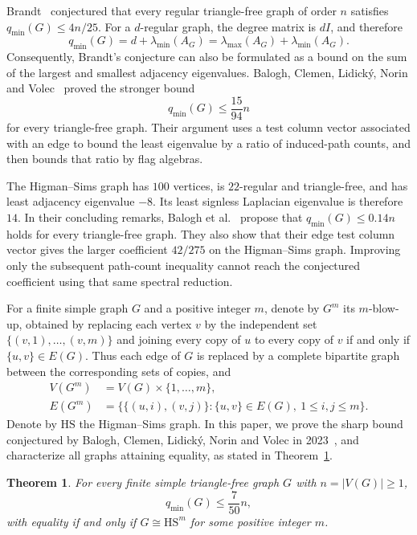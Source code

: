 \documentclass[11pt]{article}
\newcommand{\qmin}{q_{\min}}
\newtheorem{theorem}{Theorem}
\begin{document}
Brandt~\cite{Brandt} conjectured that every regular triangle-free graph
of order $n$ satisfies $\qmin(G)\leq4n/25$. For a $d$-regular graph,
the degree matrix is $dI$, and therefore
\[
\qmin(G)=d+\lambda_{\min}(A_G)
=\lambda_{\max}(A_G)+\lambda_{\min}(A_G).
\]
Consequently, Brandt's conjecture can also be formulated as a bound on
the sum of the largest and smallest adjacency eigenvalues. Balogh,
Clemen, Lidick\'y, Norin and Volec~\cite{BCLNV} proved the stronger bound
\[
\qmin(G)\leq\frac{15}{94}n
\]
for every triangle-free graph. Their argument uses a test column vector
associated with an edge to bound the least eigenvalue by a ratio of
induced-path counts, and then bounds that ratio by flag algebras.

The Higman--Sims graph has $100$ vertices, is $22$-regular and
triangle-free, and has least adjacency eigenvalue $-8$. Its least
signless Laplacian eigenvalue is therefore $14$. In their concluding
remarks, Balogh et al.~\cite{BCLNV} propose that
$\qmin(G)\leq0.14n$ holds for every triangle-free graph. They also show
that their edge test column vector gives the larger coefficient $42/275$ on
the Higman--Sims graph. Improving only the subsequent path-count
inequality cannot reach the conjectured coefficient using that same
spectral reduction.

For a finite simple graph $G$ and a positive integer $m$, denote by
$G^m$ its $m$-blow-up, obtained by replacing each vertex $v$ by the
independent set $\{(v,1),\ldots,(v,m)\}$ and joining every copy of $u$
to every copy of $v$ if and only if $\{u,v\}\in E(G)$.
Thus each edge of $G$ is replaced by a complete bipartite graph between
the corresponding sets of copies, and
\begin{align*}
V(G^m)&=V(G)\times\{1,\ldots,m\},\\
E(G^m)&=\big\{\{(u,i),(v,j)\}:\{u,v\}\in E(G),\ 1\leq i,j\leq m\big\}.
\end{align*}
Denote by $\mathrm{HS}$ the Higman--Sims graph.
In this paper, we prove the sharp bound conjectured by Balogh, Clemen,
Lidick\'y, Norin and Volec in 2023~\cite{BCLNV}, and characterize all
graphs attaining equality, as stated in Theorem~\ref{thm:bound}.
\begin{theorem}\label{thm:bound}
For every finite simple triangle-free graph $G$ with $n=|V(G)|\geq1$,
\begin{equation}\label{eq:main-bound}
\qmin(G)\leq\frac7{50}n,
\end{equation}
with equality if and only if $G\cong \mathrm{HS}^m$ for some positive integer $m$.
\end{theorem}
\end{document}

